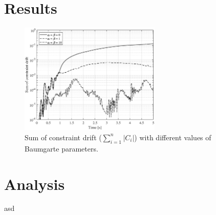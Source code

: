 \documentclass{article}
\begin{document}
\section*{Results}
\begin{figure}[htb]
	\centering
	\includegraphics[width=0.6\textwidth]{constraintdrift.eps}
	\caption{Sum of constraint drift ($\sum_{i=1}^{n} |C_i| $) with different values of Baumgarte parameters.\label{fig:constraintdrift}}
\end{figure}

\section*{Analysis}
asd
\end{document}
